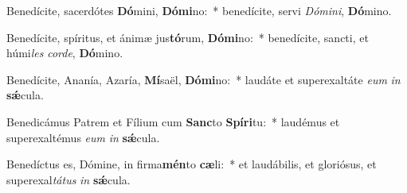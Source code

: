\item Benedícite, sacerdótes \textbf{Dó}mini, \textbf{Dó}\textbf{mi}no:~* benedícite, servi \textit{Dó}\textit{mi}\textit{ni}, \textbf{Dó}mino.
\item Benedícite, spíritus, et ánimæ jus\textbf{tó}rum, \textbf{Dó}\textbf{mi}no:~* benedícite, sancti, et húmi\textit{les} \textit{cor}\textit{de}, \textbf{Dó}mino.
\item Benedícite, Ananía, Azaría, \textbf{Mí}saël, \textbf{Dó}\textbf{mi}no:~* laudáte et superexaltáte \textit{e}\textit{um} \textit{in} \textbf{sǽ}cula.
\item Benedicámus Patrem et Fílium cum \textbf{Sanc}to \textbf{Spí}\textbf{ri}tu:~* laudémus et superexaltémus \textit{e}\textit{um} \textit{in} \textbf{sǽ}cula.
\item Benedíctus es, Dómine, in firma\textbf{mén}to \textbf{cæ}li:~* et laudábilis, et gloriósus, et superexal\textit{tá}\textit{tus} \textit{in} \textbf{sǽ}cula.
